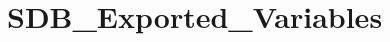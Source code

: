 \hypertarget{group___s_d_b___exported___variables}{}\section{S\+D\+B\+\_\+\+Exported\+\_\+\+Variables}
\label{group___s_d_b___exported___variables}
